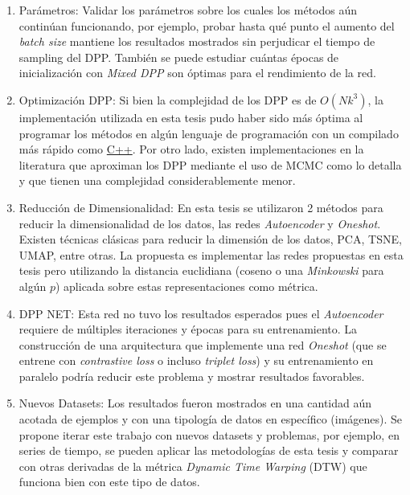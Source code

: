 \begin{enumerate}

    \item Parámetros: Validar los parámetros sobre los cuales los métodos aún continúan funcionando, por ejemplo, probar hasta qué punto el aumento del \textit{batch size} mantiene los resultados mostrados sin perjudicar el tiempo de sampling del DPP. También se puede estudiar cuántas épocas de inicialización con \textit{Mixed DPP} son óptimas para el rendimiento de la red. 
    
    \item Optimización DPP: Si bien la complejidad de los DPP es de $O(Nk^3)$, la implementación utilizada en esta tesis pudo haber sido más óptima al programar los métodos en algún lenguaje de programación con un compilado más rápido como \href{https://es.wikipedia.org/wiki/C\%2B\%2B}{C++}. Por otro lado, existen implementaciones en la literatura que aproximan los DPP mediante el uso de MCMC como lo detalla \cite{https://doi.org/10.48550/arxiv.1602.05242} y que tienen una complejidad considerablemente menor.
    
    \item Reducción de Dimensionalidad: En esta tesis se utilizaron 2 métodos para reducir la dimensionalidad de los datos, las redes \textit{Autoencoder} y \textit{Oneshot}. Existen técnicas clásicas para reducir la dimensión de los datos, PCA, TSNE, UMAP, entre otras. La propuesta es implementar las redes propuestas en esta tesis pero utilizando la distancia euclidiana (coseno o una \textit{Minkowski} para algún $p$) aplicada sobre estas representaciones como métrica. 
    
    \item DPP NET: Esta red no tuvo los resultados esperados pues el \textit{Autoencoder} requiere de múltiples iteraciones y épocas para su entrenamiento. La construcción de una arquitectura que implemente una red \textit{Oneshot} (que se entrene con \textit{contrastive loss} o incluso \textit{triplet loss}) y su entrenamiento en paralelo podría reducir este problema y mostrar resultados favorables. 
    
    \item Nuevos Datasets: Los resultados fueron mostrados en una cantidad aún acotada de ejemplos y con una tipología de datos en específico (imágenes). Se propone iterar este trabajo con nuevos datasets y problemas, por ejemplo, en series de tiempo, se pueden aplicar las metodologías de esta tesis y comparar con otras derivadas de la métrica \textit{Dynamic Time Warping} (DTW) que funciona bien con este tipo de datos. 
    

\end{enumerate}
